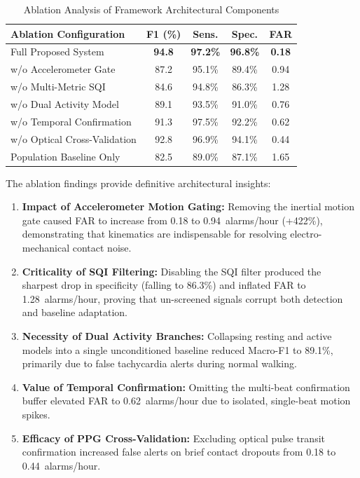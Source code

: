 \documentclass{ieeeaccess}
\begin{document}
\begin{table}[t]
\caption{Ablation Analysis of Framework Architectural Components}
\label{tab:ablation}
\centering
\scriptsize
\renewcommand{\arraystretch}{1.15}
\begin{tabularx}{\columnwidth}{p{} c c c c}
\toprule
\textbf{Ablation Configuration} & \textbf{F1 (\%)} & \textbf{Sens.} & \textbf{Spec.} & \textbf{FAR} \\
\midrule
Full Proposed System & \textbf{94.8} & \textbf{97.2\%} & \textbf{96.8\%} & \textbf{0.18} \\
w/o Accelerometer Gate & 87.2 & 95.1\% & 89.4\% & 0.94 \\
w/o Multi-Metric SQI & 84.6 & 94.8\% & 86.3\% & 1.28 \\
w/o Dual Activity Model & 89.1 & 93.5\% & 91.0\% & 0.76 \\
w/o Temporal Confirmation & 91.3 & 97.5\% & 92.2\% & 0.62 \\
w/o Optical Cross-Validation & 92.8 & 96.9\% & 94.1\% & 0.44 \\
Population Baseline Only & 82.5 & 89.0\% & 87.1\% & 1.65 \\
\bottomrule
\end{tabularx}
\end{table}

The ablation findings provide definitive architectural insights:
\begin{enumerate}
\item \textbf{Impact of Accelerometer Motion Gating:} Removing the inertial motion gate caused FAR to increase from 0.18 to 0.94~alarms/hour (+422\%), demonstrating that kinematics are indispensable for resolving electro-mechanical contact noise.
\item \textbf{Criticality of SQI Filtering:} Disabling the SQI filter produced the sharpest drop in specificity (falling to 86.3\%) and inflated FAR to 1.28~alarms/hour, proving that un-screened signals corrupt both detection and baseline adaptation.
\item \textbf{Necessity of Dual Activity Branches:} Collapsing resting and active models into a single unconditioned baseline reduced Macro-F1 to 89.1\%, primarily due to false tachycardia alerts during normal walking.
\item \textbf{Value of Temporal Confirmation:} Omitting the multi-beat confirmation buffer elevated FAR to 0.62~alarms/hour due to isolated, single-beat motion spikes.
\item \textbf{Efficacy of PPG Cross-Validation:} Excluding optical pulse transit confirmation increased false alerts on brief contact dropouts from 0.18 to 0.44~alarms/hour.
\end{enumerate}
\end{document}

